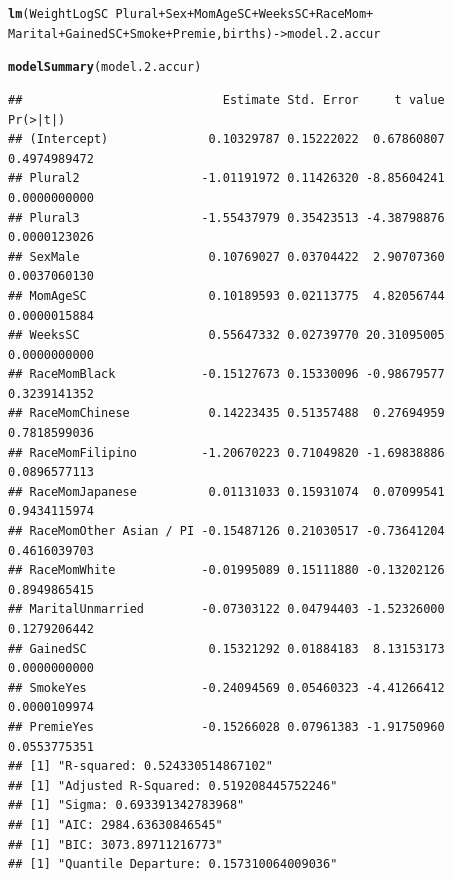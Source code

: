 \documentclass{article}\usepackage[]{graphicx}\usepackage[]{xcolor}
\makeatletter
\newcommand{\hlopt}[1]{\textcolor[rgb]{0,0,0}{#1}}%
\newcommand{\hlstd}[1]{\textcolor[rgb]{0.345,0.345,0.345}{#1}}%
\newcommand{\hlkwb}[1]{\textcolor[rgb]{0.69,0.353,0.396}{#1}}%
\newcommand{\hlkwd}[1]{\textcolor[rgb]{0.737,0.353,0.396}{\textbf{#1}}}%
\newenvironment{kframe}{%
 \def\at@end@of@kframe{}%
 \ifinner\ifhmode%
  \def\at@end@of@kframe{\end{minipage}}%
  \begin{minipage}{\columnwidth}%
 \fi\fi%
 \def\FrameCommand##1{\hskip\@totalleftmargin \hskip-\fboxsep
 \colorbox{shadecolor}{##1}\hskip-\fboxsep
     \hskip-\linewidth \hskip-\@totalleftmargin \hskip\columnwidth}%
 \MakeFramed {\advance\hsize-\width
   \@totalleftmargin\z@ \linewidth\hsize
   \@setminipage}}%
 {\par\unskip\endMakeFramed%
 \at@end@of@kframe}
\newenvironment{knitrout}{}{} %
\makeatother
\begin{document}
\begin{knitrout}
\begin{kframe}\begin{alltt}
\hlkwd{lm}\hlstd{(WeightLogSC} \hlopt{~} \hlstd{Plural} \hlopt{+} \hlstd{Sex} \hlopt{+} \hlstd{MomAgeSC} \hlopt{+} \hlstd{WeeksSC} \hlopt{+} \hlstd{RaceMom} \hlopt{+}
     \hlstd{Marital} \hlopt{+} \hlstd{GainedSC} \hlopt{+} \hlstd{Smoke} \hlopt{+} \hlstd{Premie, births)} \hlkwb{->} \hlstd{model.2.accur}

\hlkwd{modelSummary}\hlstd{(model.2.accur)}
\end{alltt}
\begin{verbatim}
##                            Estimate Std. Error     t value     Pr(>|t|)
## (Intercept)              0.10329787 0.15222022  0.67860807 0.4974989472
## Plural2                 -1.01191972 0.11426320 -8.85604241 0.0000000000
## Plural3                 -1.55437979 0.35423513 -4.38798876 0.0000123026
## SexMale                  0.10769027 0.03704422  2.90707360 0.0037060130
## MomAgeSC                 0.10189593 0.02113775  4.82056744 0.0000015884
## WeeksSC                  0.55647332 0.02739770 20.31095005 0.0000000000
## RaceMomBlack            -0.15127673 0.15330096 -0.98679577 0.3239141352
## RaceMomChinese           0.14223435 0.51357488  0.27694959 0.7818599036
## RaceMomFilipino         -1.20670223 0.71049820 -1.69838886 0.0896577113
## RaceMomJapanese          0.01131033 0.15931074  0.07099541 0.9434115974
## RaceMomOther Asian / PI -0.15487126 0.21030517 -0.73641204 0.4616039703
## RaceMomWhite            -0.01995089 0.15111880 -0.13202126 0.8949865415
## MaritalUnmarried        -0.07303122 0.04794403 -1.52326000 0.1279206442
## GainedSC                 0.15321292 0.01884183  8.13153173 0.0000000000
## SmokeYes                -0.24094569 0.05460323 -4.41266412 0.0000109974
## PremieYes               -0.15266028 0.07961383 -1.91750960 0.0553775351
## [1] "R-squared: 0.524330514867102"
## [1] "Adjusted R-Squared: 0.519208445752246"
## [1] "Sigma: 0.693391342783968"
## [1] "AIC: 2984.63630846545"
## [1] "BIC: 3073.89711216773"
## [1] "Quantile Departure: 0.157310064009036"
\end{verbatim}
\end{kframe}

\end{knitrout}
\end{document}
